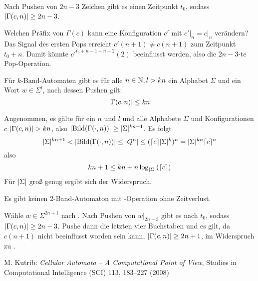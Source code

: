 \documentclass{article}
\begin{document}
\begin{satz}
    \label{thm:locontent}
    Nach Pushen von $2n-3$ Zeichen gibt es einen Zeitpunkt $t_0$, sodass $\lvert\Gamma(c,n)\rvert \geq 2n-3$.
    \begin{beweis}
        Welchen Präfix von $\Gamma(c)$ kann eine Konfiguration $c'$ mit $c' \big|_n = c \big|_n$ verändern? Das Signal des ersten Pops erreicht $c'(n+1) \neq c(n+1)$ zum Zeitpunkt $t_0+n$. Damit könnte $c'^{t_0+n-1+n-2}(2)$ beeinflusst werden, also die $2n-3$-te Pop-Operation.
    \end{beweis}
\end{satz}

\begin{satz}
    \label{cor:spacesize}
    Für $k$-Band-Automaten gibt es für alle $n \in \mathbb{N}, l > kn$ ein Alphabet $\Sigma$ und ein Wort $w \in \Sigma^l$, nach dessen Pushen gilt:
    \[ \lvert\Gamma(c,n)\rvert \leq kn \]
    \begin{beweis}
        Angenommen, es gälte für ein $n$ und $l$ und alle Alphabete $\Sigma$ und Konfigurationen $c$ $\lvert\Gamma(c,n)\rvert > kn$, also $\lvert\text{Bild}(\Gamma(\cdot,n))\rvert \geq \lvert\Sigma\rvert^{kn+1}$.
        Es folgt
        \[ \lvert\Sigma\rvert^{kn+1} < \lvert\text{Bild}(\Gamma(\cdot,n))\rvert \leq \lvert Q^n\rvert \leq (\lceil c\rceil\lvert\Sigma\rvert^k)^n = \lvert\Sigma\rvert^{kn} \lceil c\rceil^n \]
        also
        \[ kn + 1 \leq kn + n \log_{\lvert\Sigma\rvert}(\lceil c\rceil) \]
        Für $\lvert\Sigma\rvert$ groß genug ergibt sich der Widerspruch.
    \end{beweis}
\end{satz}

\begin{satz}
    Es gibt keinen 2-Band-Automaton mit \pop-Operation ohne Zeitverlust.
    \begin{beweis}
        Wähle $w \in \Sigma^{2n+1}$ nach . Nach Pushen von $w \big|_{2n-3}$ gibt es nach  $t_0$, sodass $\lvert\Gamma(c,n)\rvert \geq 2n-3$. Pushe dann die letzten vier Buchstaben und es gilt, da $c(n+1)$ nicht beeinflusst worden sein kann, $\lvert\Gamma(c,n)\rvert \geq 2n+1$, im Widerspruch zu .
    \end{beweis}
\end{satz}

\begin{thebibliography}{9}

        M. Kutrib: \emph{Cellular Automata – A Computational Point of View}, Studies in Computational Intelligence (SCI) 113, 183–227 (2008)

\end{thebibliography}
\end{document}
